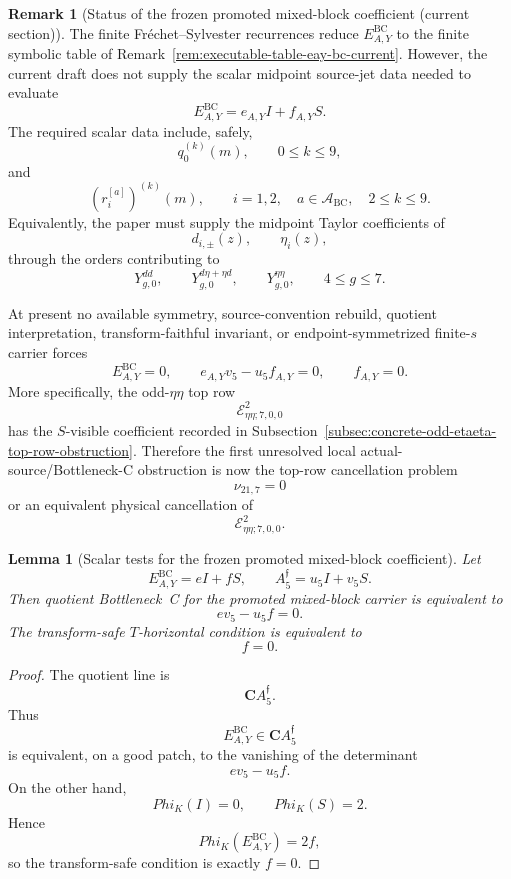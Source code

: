 \documentclass[11pt,a4paper]{amsart}
\def\Phi{Phi}%
\theoremstyle{plain}
\newtheorem{lemma}[theorem]{Lemma}
\theoremstyle{definition}
\newtheorem{remark}[theorem]{Remark}
\begin{document}
\begin{remark}[Status of the frozen promoted mixed-block coefficient (current section)]
\label{rem:status-eay-bc-current}
The finite Fr\'echet--Sylvester recurrences reduce
\(E_{A,Y}^{\mathrm{BC}}\) to the finite symbolic table of
Remark~\ref{rem:executable-table-eay-bc-current}.  However, the current draft
does not supply the scalar midpoint source-jet data needed to evaluate
\[
E_{A,Y}^{\mathrm{BC}}=e_{A,Y}I+f_{A,Y}S.
\]
The required scalar data include, safely,
\[
q_0^{(k)}(m),
\qquad
0\le k\le9,
\]
and
\[
(r_i^{[a]})^{(k)}(m),
\qquad
i=1,2,\quad a\in\mathcal A_{\mathrm{BC}},\quad 2\le k\le9.
\]
Equivalently, the paper must supply the midpoint Taylor coefficients of
\[
d_{i,\pm}(z),
\qquad
\eta_i(z),
\]
through the orders contributing to
\[
Y^{dd}_{g,0},
\qquad
Y^{d\eta+\eta d}_{g,0},
\qquad
Y^{\eta\eta}_{g,0},
\qquad
4\le g\le7.
\]

At present no available symmetry, source-convention rebuild, quotient
interpretation, transform-faithful invariant, or endpoint-symmetrized
finite-\(s\) carrier forces
\[
E_{A,Y}^{\mathrm{BC}}=0,
\qquad
e_{A,Y}v_5-u_5f_{A,Y}=0,
\qquad
f_{A,Y}=0.
\]
More specifically, the odd-\(\eta\eta\) top row
\[
\mathcal E^{2}_{\eta\eta;7,0,0}
\]
has the \(S\)-visible coefficient recorded in
Subsection~\ref{subsec:concrete-odd-etaeta-top-row-obstruction}.  Therefore
the first unresolved local actual-source/Bottleneck-C obstruction is now the
top-row cancellation problem
\[
\nu_{21,7}=0
\]
or an equivalent physical cancellation of
\[
\mathcal E^{2}_{\eta\eta;7,0,0}.
\]
\end{remark}

\begin{lemma}[Scalar tests for the frozen promoted mixed-block coefficient]
\label{lem:scalar-tests-eay-bc}
Let
\[
E_{A,Y}^{\mathrm{BC}}=eI+fS,
\qquad
A_5^{\mathfrak f}=u_5I+v_5S.
\]
Then quotient Bottleneck~C for the promoted mixed-block carrier is equivalent
to
\[
ev_5-u_5f=0.
\]
The transform-safe \(T\)-horizontal condition is equivalent to
\[
f=0.
\]
\end{lemma}

\begin{proof}
The quotient line is
\[
\mathbf C A_5^{\mathfrak f}.
\]
Thus
\[
E_{A,Y}^{\mathrm{BC}}\in \mathbf C A_5^{\mathfrak f}
\]
is equivalent, on a good patch, to the vanishing of the determinant
\[
ev_5-u_5f.
\]
On the other hand,
\[
\Phi_K(I)=0,
\qquad
\Phi_K(S)=2.
\]
Hence
\[
\Phi_K(E_{A,Y}^{\mathrm{BC}})=2f,
\]
so the transform-safe condition is exactly \(f=0\).
\end{proof}
\end{document}
